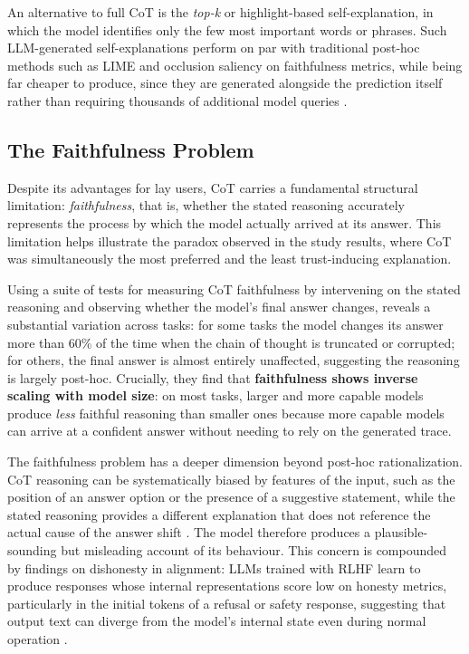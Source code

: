 An alternative to full CoT is the \emph{top-k} or highlight-based self-explanation, in which the model identifies only the few most important words or phrases. Such LLM-generated self-explanations perform on par with traditional post-hoc methods such as LIME and occlusion saliency on faithfulness metrics, while being far cheaper to produce, since they are generated alongside the prediction itself rather than requiring thousands of additional model queries \cite{huang_can_2023}.

\subsection{The Faithfulness Problem}
\label{sec:faithfulness_problem}

Despite its advantages for lay users, CoT carries a fundamental structural limitation:
\emph{faithfulness}, that is, whether the stated reasoning accurately represents the process
by which the model actually arrived at its answer. This limitation helps illustrate the paradox
observed in the study results, where CoT was simultaneously the most preferred and the
least trust-inducing explanation.

Using a suite of tests for measuring CoT faithfulness by
intervening on the stated reasoning and observing whether the model's final answer changes, reveals a substantial variation across tasks: for some tasks the model changes its
answer more than 60\% of the time when the chain of thought is truncated or corrupted; for
others, the final answer is almost entirely unaffected, suggesting the reasoning is largely
post-hoc. Crucially, they find that \textbf{faithfulness shows inverse scaling with model
size}: on most tasks, larger and more capable models produce \emph{less} faithful reasoning
than smaller ones because more capable models can arrive at a confident answer without
needing to rely on the generated trace.\cite{lanham_measuring_2023}

The faithfulness problem has a deeper dimension beyond post-hoc rationalization.  CoT reasoning can be systematically biased by features of the input, such as the position of an answer option or the presence of a suggestive statement, while the stated reasoning provides a different explanation that does not reference the actual cause of the answer shift \cite{turpin_language_2023}. The model therefore produces a plausible-sounding but misleading account of its behaviour.
This concern is compounded by findings on dishonesty in alignment: LLMs trained with RLHF learn to produce responses whose internal representations score low on honesty metrics, particularly in the initial tokens of a refusal or safety response, suggesting that output text can diverge from the model's internal state even during normal operation \cite{huang_dishonesty_2024}.

